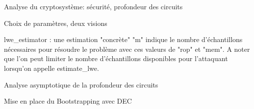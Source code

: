 \begin{section}{Analyse du cryptosystème: sécurité, profondeur des circuits}
\begin{subsection}{Choix de paramètres, deux visions}
\begin{subsubsection}{lwe\_estimator : une estimation "concrète"}
	"m" indique le nombre d'échantillons nécessaires pour résoudre le problème avec ces valeurs de
	"rop" et "mem". A noter que l'on peut limiter le nombre d'échantillons disponibles pour l'attaquant
	lorsqu'on appelle estimate\_lwe.
	\end{subsubsection}
	\end{subsection}
	\begin{subsection}{Analyse asymptotique de la profondeur des circuits}
	\end{subsection}
	\begin{subsection}{Mise en place du Bootstrapping avec DEC}
	\end{subsection}
\end{section}
